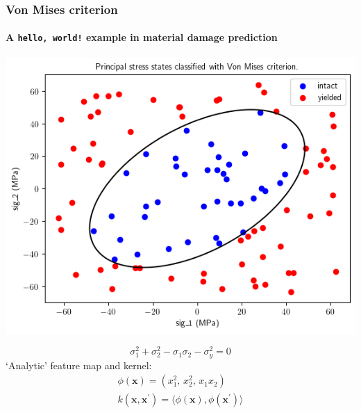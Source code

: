 \documentclass{beamer}
\begin{document}
    \begin{frame}
        \frametitle{Von Mises criterion}
        \framesubtitle{A \texttt{hello, world!} example in material damage prediction}
        
        
        \begin{minipage}{.45\textwidth}
            \centering
            \includegraphics[width=\textwidth]{pics/vm-data-envelope.png}
            
        \end{minipage}
        \hspace{1cm}
        \begin{minipage}{.3\textwidth}
            \[
                \sigma_1^2 + \sigma_2^2 -\sigma_1\sigma_2 - \sigma_y^2 = 0
            \]
            \pause
            `Analytic' feature map and kernel:
            \begin{gather*}
                \phi\left( \mathbf{x} \right) = \left( x_1^2,\, x_2^2,\, x_1 x_2 \right)\\
                k\left( \mathbf{x}, \mathbf{x}^\prime \right) = \langle \phi\left( \mathbf{x} \right), \phi\left( \mathbf{x}^\prime \right) \rangle
            \end{gather*}
        \end{minipage}
        
        
    \end{frame}
    
\end{document}

